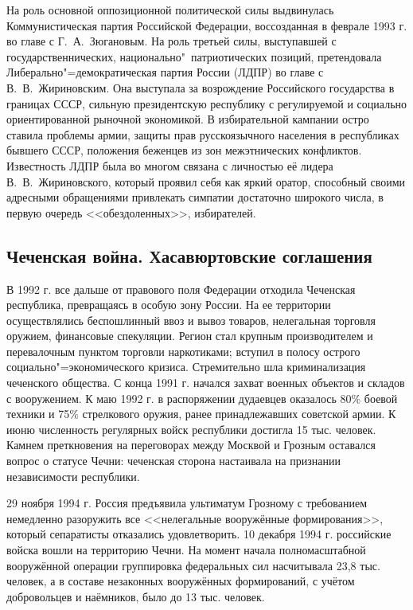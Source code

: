 На роль основной оппозиционной политической силы выдвинулась Коммунистическая партия Российской Федерации, воссозданная в феврале 1993 г. во главе с Г.~А.~Зюгановым. На роль третьей силы, выступавшей с государственнических, национально"~патриотических позиций, претендовала Либерально"=демократическая партия России (ЛДПР) во главе с В.~В.~Жириновским. Она выступала за возрождение Российского государства в границах СССР, сильную президентскую республику с регулируемой и социально ориентированной рыночной экономикой. В избирательной кампании остро ставила проблемы армии, защиты прав русскоязычного населения в республиках бывшего СССР, положения беженцев из зон межэтнических конфликтов. Известность ЛДПР была во многом связана с личностью её лидера В.~В.~Жириновского, который проявил себя как яркий оратор, способный своими адресными обращениями привлекать симпатии достаточно широкого числа, в первую очередь <<обездоленных>>, избирателей.

\subsection{Чеченская война. Хасавюртовские соглашения}

В 1992 г. все дальше от правового поля Федерации отходила Чеченская республика, превращаясь в особую зону России. На ее территории осуществлялись беспошлинный ввоз и вывоз товаров, нелегальная торговля оружием, финансовые спекуляции. Регион стал крупным производителем и перевалочным пунктом торговли наркотиками; вступил в полосу острого социально"=экономического кризиса. Стремительно шла криминализация чеченского общества. С конца 1991 г. начался захват военных объектов и складов с вооружением. К маю 1992 г. в распоряжении дудаевцев оказалось 80\% боевой техники и 75\% стрелкового оружия, ранее принадлежавших советской армии. К июню численность регулярных войск республики достигла 15 тыс. человек. Камнем преткновения на переговорах между Москвой и Грозным оставался вопрос о статусе Чечни: чеченская сторона настаивала на признании независимости республики.

29 ноября 1994 г. Россия предъявила ультиматум Грозному с требованием немедленно разоружить все <<нелегальные вооружённые формирования>>, который сепаратисты отказались удовлетворить. 10 декабря 1994 г. российские войска вошли на территорию Чечни. На момент начала полномасштабной вооружённой операции группировка федеральных сил насчитывала 23,8 тыс. человек, а в составе незаконных вооружённых формирований, с учётом добровольцев и наёмников, было до 13 тыс. человек.

